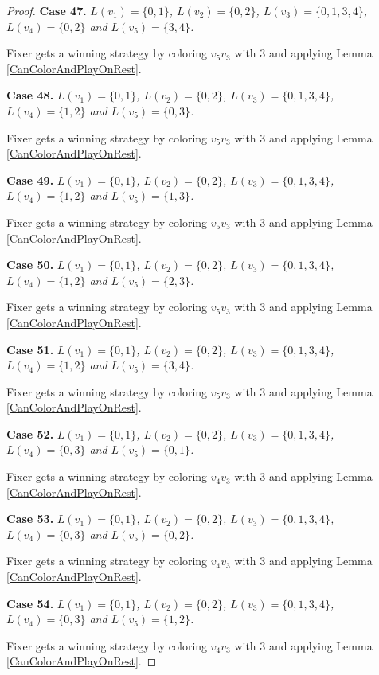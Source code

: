 \documentclass[12pt]{amsart}
\theoremstyle{plain}
\theoremstyle{definition}
\theoremstyle{remark}
\begin{document}
\begin{proof}
\noindent\textbf{Case 47.  }\textit{$L(v_1) = \{0, 1\}$, $L(v_2) = \{0, 2\}$, $L(v_3) = \{0, 1, 3, 4\}$, $L(v_4) = \{0, 2\}$ and $L(v_5) = \{3, 4\}$.}

Fixer gets a winning strategy by coloring $v_5v_3$ with $3$ and applying Lemma \ref{CanColorAndPlayOnRest}.

\noindent\textbf{Case 48.  }\textit{$L(v_1) = \{0, 1\}$, $L(v_2) = \{0, 2\}$, $L(v_3) = \{0, 1, 3, 4\}$, $L(v_4) = \{1, 2\}$ and $L(v_5) = \{0, 3\}$.}

Fixer gets a winning strategy by coloring $v_5v_3$ with $3$ and applying Lemma \ref{CanColorAndPlayOnRest}.

\noindent\textbf{Case 49.  }\textit{$L(v_1) = \{0, 1\}$, $L(v_2) = \{0, 2\}$, $L(v_3) = \{0, 1, 3, 4\}$, $L(v_4) = \{1, 2\}$ and $L(v_5) = \{1, 3\}$.}

Fixer gets a winning strategy by coloring $v_5v_3$ with $3$ and applying Lemma \ref{CanColorAndPlayOnRest}.

\noindent\textbf{Case 50.  }\textit{$L(v_1) = \{0, 1\}$, $L(v_2) = \{0, 2\}$, $L(v_3) = \{0, 1, 3, 4\}$, $L(v_4) = \{1, 2\}$ and $L(v_5) = \{2, 3\}$.}

Fixer gets a winning strategy by coloring $v_5v_3$ with $3$ and applying Lemma \ref{CanColorAndPlayOnRest}.

\noindent\textbf{Case 51.  }\textit{$L(v_1) = \{0, 1\}$, $L(v_2) = \{0, 2\}$, $L(v_3) = \{0, 1, 3, 4\}$, $L(v_4) = \{1, 2\}$ and $L(v_5) = \{3, 4\}$.}

Fixer gets a winning strategy by coloring $v_5v_3$ with $3$ and applying Lemma \ref{CanColorAndPlayOnRest}.

\noindent\textbf{Case 52.  }\textit{$L(v_1) = \{0, 1\}$, $L(v_2) = \{0, 2\}$, $L(v_3) = \{0, 1, 3, 4\}$, $L(v_4) = \{0, 3\}$ and $L(v_5) = \{0, 1\}$.}

Fixer gets a winning strategy by coloring $v_4v_3$ with $3$ and applying Lemma \ref{CanColorAndPlayOnRest}.

\noindent\textbf{Case 53.  }\textit{$L(v_1) = \{0, 1\}$, $L(v_2) = \{0, 2\}$, $L(v_3) = \{0, 1, 3, 4\}$, $L(v_4) = \{0, 3\}$ and $L(v_5) = \{0, 2\}$.}

Fixer gets a winning strategy by coloring $v_4v_3$ with $3$ and applying Lemma \ref{CanColorAndPlayOnRest}.

\noindent\textbf{Case 54.  }\textit{$L(v_1) = \{0, 1\}$, $L(v_2) = \{0, 2\}$, $L(v_3) = \{0, 1, 3, 4\}$, $L(v_4) = \{0, 3\}$ and $L(v_5) = \{1, 2\}$.}

Fixer gets a winning strategy by coloring $v_4v_3$ with $3$ and applying Lemma \ref{CanColorAndPlayOnRest}.


\end{proof}
\end{document}
